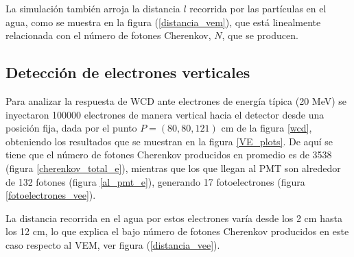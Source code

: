 \documentclass[12pt,oneside,openany,letter]{book}
\begin{document}
La simulación también arroja la distancia $l$ recorrida por las partículas en el agua, como se muestra en la figura (\ref{distancia_vem}), que está linealmente relacionada con el número de fotones Cherenkov, $N$, que se producen. 


\subsection{Detección de electrones verticales}
Para analizar la respuesta de WCD ante electrones de energía típica (20 MeV) se inyectaron 100000 electrones de manera vertical hacia el detector desde una posición fija, dada por el punto $P=(80, 80, 121)$ cm de la figura \ref{wcd}, obteniendo los resultados que se muestran en la figura \ref{VE_plots}. De aquí se tiene que el número de fotones Cherenkov producidos en promedio es de 3538 (figura \ref{cherenkov_total_e}), mientras que los que llegan al PMT son alrededor de 132 fotones (figura \ref{al_pmt_e}), generando 17 fotoelectrones (figura \ref{fotoelectrones_vee}).

La distancia recorrida en el agua por estos electrones varía desde los 2 cm hasta los 12 cm, lo que explica el bajo número de fotones Cherenkov producidos en este caso respecto al VEM, ver figura (\ref{distancia_vee}).
\end{document}
